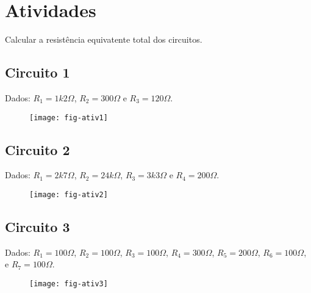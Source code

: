 \newpage
\section{Atividades}

Calcular a resistência equivatente total dos circuitos.

\subsection{ Circuito 1}
Dados:
$R_1 = 1k2\Omega$,
$R_2 = 300\Omega$ e
$R_3 = 120\Omega$.
\begin{figure}[H]
  \centering
  \label{fig:ativ1}
  \texttt{[image: fig-ativ1]}
\end{figure}

\subsection{ Circuito 2}
Dados:
$R_1 = 2k7\Omega$,
$R_2 = 24k\Omega$,
$R_3 = 3k3\Omega$ e
$R_4 = 200\Omega$.
\begin{figure}[H]
  \centering
  \label{fig:ativ1}
  \texttt{[image: fig-ativ2]}
\end{figure}

\subsection{ Circuito 3}
Dados:
$R_1 = 100\Omega$,
$R_2 = 100\Omega$,
$R_3 = 100\Omega$,
$R_4 = 300\Omega$,
$R_5 = 200\Omega$,
$R_6 = 100\Omega$, e
$R_7 = 100\Omega$.
\begin{figure}[H]
  \centering
  \label{fig:ativ1}
  \texttt{[image: fig-ativ3]}
\end{figure}
